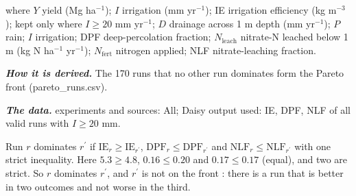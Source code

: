 \par\noindent where $Y$ yield (Mg ha$^{-1}$); $I$ irrigation (mm yr$^{-1}$); IE irrigation efficiency (kg m$^{-3}$); kept only where $I\ge 20$ mm yr$^{-1}$; $D$ drainage across 1 m depth (mm yr$^{-1}$); $P$ rain; $I$ irrigation; DPF deep-percolation fraction; $N_{\mathrm{leach}}$ nitrate-N leached below 1 m (kg N ha$^{-1}$ yr$^{-1}$); $N_{\mathrm{fert}}$ nitrogen applied; NLF nitrate-leaching fraction.
\par\noindent\textbf{\color{khmag}\emph{How it is derived.}} The 170 runs that no other run dominates form the Pareto front (pareto\_runs.csv).
\par\noindent\textbf{\color{khmag}\emph{The data.}} experiments and sources: All; Daisy output used: IE, DPF, NLF of all valid runs with $I\ge20$ mm.
\sol {}
\par\noindent Run $r$ dominates $r^\prime$ if $\mathrm{IE}_r\ge\mathrm{IE}_{r^\prime}$, $\mathrm{DPF}_r\le\mathrm{DPF}_{r^\prime}$ and $\mathrm{NLF}_r\le\mathrm{NLF}_{r^\prime}$ with one strict inequality. Here $5.3\ge4.8$, $0.16\le0.20$ and $0.17\le0.17$ (equal), and two are strict. So $r$ dominates $r^\prime$, and $r^\prime$ is not on the front \finans: there is a run that is better in two outcomes and not worse in the third.

